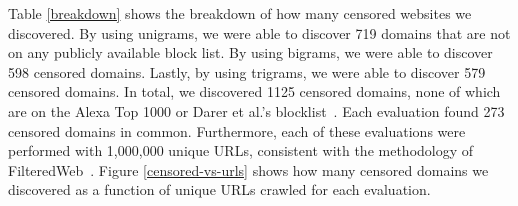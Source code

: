 \begin{table}[b]
  \begin{center}
  \end{center}
  \caption{\label{effective-unigrams}Sample of unigrams with
    significant blockrates}
\end{table}

Table \ref{breakdown} shows the breakdown of how many censored
websites we discovered. By using unigrams, we were able to discover
719 domains that are not on any publicly available block list. By
using bigrams, we were able to discover 598 censored domains. Lastly,
by using trigrams, we were able to discover 579 censored domains. In
total, we discovered 1125 censored domains, none of which are on the
Alexa Top 1000 or Darer et al.'s blocklist~\cite{darer2017filteredweb,
  alexa:top1000}. Each evaluation found 273
censored domains in common. Furthermore, each of these evaluations
were performed with 1,000,000 unique URLs, consistent with the
methodology of FilteredWeb~\cite{darer2017filteredweb}. Figure
\ref{censored-vs-urls} shows how many censored domains we discovered
as a function of unique URLs crawled for each evaluation.

